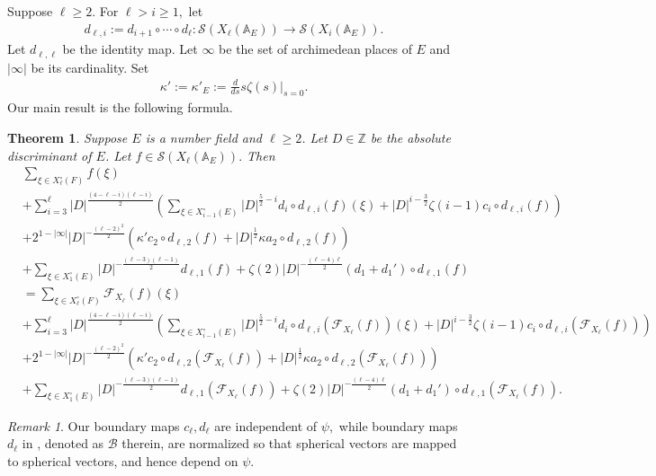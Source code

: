 \documentclass[11pt,a4paper,reqno]{amsart}
\newtheorem{thm}{Theorem}[section]
\theoremstyle{remark}
\newtheorem*{rem}{Remark}
\numberwithin{equation}{section}
\newcommand{\A}{\mathbb{A}}
\newcommand{\ZZ}{\mathbb{Z}}
\theoremstyle{definition}
\numberwithin{equation}{section}
\begin{document}
Suppose $\ell\ge 2.$ For $\ell> i\ge 1,$ let
\begin{align*}
    d_{\ell,i}:=d_{i+1}\circ\cdots \circ d_\ell:\mathcal{S}(X_\ell(\A_E))\longrightarrow\mathcal{S}(X_{i}(\A_E)).
\end{align*}
Let $d_{\ell,\ell}$ be the identity map. Let $\infty$ be the set of archimedean places of $E$ and $|\infty|$ be its cardinality. Set
\begin{align*}
    \kappa':=\kappa'_E:=\frac{d}{ds}s\zeta(s)\bigg|_{s=0}.
\end{align*}
Our main result is the following formula.
\begin{thm}\label{thm:main}
    Suppose $E$ is a number field and $\ell\ge 2$.  Let $D\in \ZZ$ be the absolute discriminant of $E$. Let $f\in \mathcal{S}(X_{\ell}(\A_E)).$ Then
    \begin{align*}
        &\sum_{\xi\in X_\ell^\circ(F)}f(\xi)\\
        &+\sum_{i=3}^{\ell} |D|^{\frac{(4-\ell-i)(\ell-i)}{2}}\left(\sum_{\xi\in X_{i-1}^\circ(E)} |D|^{\frac{5}{2}-i}d_i\circ d_{\ell,i}(f)(\xi)+|D|^{i-\frac{3}{2}}\zeta(i-1)c_i\circ d_{\ell,i}(f)\right)\\
        &+2^{1-|\infty|}|D|^{-\frac{(\ell-2)^2}{2}}\left(\kappa'c_2\circ d_{\ell,2}(f)+|D|^{\frac{1}{2}}\kappa a_2\circ d_{\ell,2}(f)\right)\\
        &+\sum_{\xi\in X_1^\circ(E)}
        |D|^{-\frac{(\ell-3)(\ell-1)}{2}}d_{\ell,1}(f) + \zeta(2)|D|^{-\frac{(\ell-4)\ell}{2}}(d_1+d_1')\circ d_{\ell,1}(f)\\
       &=\sum_{\xi\in X_\ell^\circ(F)}\mathcal{F}_{X_\ell}(f)(\xi)\\
       &+\sum_{i=3}^{\ell} |D|^{\frac{(4-\ell-i)(\ell-i)}{2}}\left(\sum_{\xi\in X_{i-1}^\circ(E)} |D|^{\frac{5}{2}-i}d_i\circ d_{\ell,i}(\mathcal{F}_{X_\ell}(f))(\xi)+|D|^{i-\frac{3}{2}}\zeta(i-1)c_i\circ d_{\ell,i}(\mathcal{F}_{X_\ell}(f))\right)\\
        &+2^{1-|\infty|}|D|^{-\frac{(\ell-2)^2}{2}}\left(\kappa'c_2\circ d_{\ell,2}(\mathcal{F}_{X_\ell}(f))+|D|^{\frac{1}{2}}\kappa a_2\circ d_{\ell,2}(\mathcal{F}_{X_\ell}(f))\right)\\
        &+\sum_{\xi\in X_1^\circ(E)}
        |D|^{-\frac{(\ell-3)(\ell-1)}{2}} d_{\ell,1}(\mathcal{F}_{X_\ell}(f))+\zeta(2)|D|^{-\frac{(\ell-4)\ell}{2}}(d_1+d_1')\circ d_{\ell,1}(\mathcal{F}_{X_\ell}(f)).
    \end{align*}
\end{thm}

\begin{rem}
    Our boundary maps $c_\ell,d_\ell$ are independent of $\psi,$ while
  boundary maps $d_\ell$  in \cite{GK:auto}, denoted as $\mathcal{B}$ therein, are normalized so that spherical vectors are mapped to spherical vectors, and hence depend on $\psi.$
\end{rem}
\end{document}
